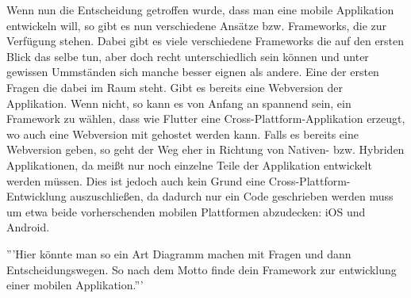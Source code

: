 Wenn nun die Entscheidung getroffen wurde, dass man eine mobile Applikation entwickeln will, so gibt es nun verschiedene Ansätze bzw. Frameworks, die zur Verfügung stehen. Dabei gibt es viele verschiedene Frameworks die auf den ersten Blick das selbe tun, aber doch recht unterschiedlich sein können und unter gewissen Ummständen sich manche besser eignen als andere. 
Eine der ersten Fragen die dabei im Raum steht. Gibt es bereits eine Webversion der Applikation.
Wenn nicht, so kann es von Anfang an spannend sein, ein Framework zu wählen, dass wie Flutter eine Cross-Plattform-Applikation erzeugt, wo auch eine Webversion mit gehostet werden kann.
Falls es bereits eine Webversion geben, so geht der Weg eher in Richtung von Nativen- bzw. Hybriden Applikationen, da meißt nur noch einzelne Teile der Applikation entwickelt werden müssen. Dies ist jedoch auch kein Grund eine Cross-Plattform-Entwicklung auszuschließen, da dadurch nur ein Code geschrieben werden muss um etwa beide vorherschenden mobilen Plattformen abzudecken: iOS und Android.

'''Hier könnte man so ein Art Diagramm machen mit Fragen und dann Entscheidungswegen. So nach dem Motto finde dein Framework zur entwicklung einer mobilen Applikation.'''



